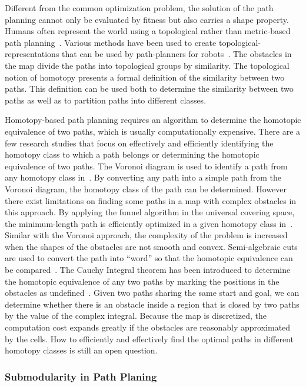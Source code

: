 \documentclass[phd]{byuprop}
\begin{document}
Different from the common optimization problem, the solution of the path planning cannot only be evaluated by fitness but also carries a shape property.
Humans often represent the world using a topological rather than metric-based path planning~\cite{Aginsky1997,kuipers1999}. 
Various methods have been used to create topological-representations that can be used by path-planners for robots~\cite{Mataric1992,Thrun1998,Fasola2013,Shah2013}.
The obstacles in the map divide the paths into topological groups by similarity. 
The topological notion of homotopy presents a formal definition of the similarity between two paths. 
This definition can be used both to determine the similarity between two paths as well as to partition paths into different classes.

Homotopy-based path planning requires an algorithm to determine the homotopic equivalence of two paths, which is usually computationally expensive. 
There are a few research studies that focus on effectively and efficiently identifying the homotopy class to which a path belongs or determining the homotopic equivalence of two paths. 
The Voronoi diagram is used to identify a path from any homotopy class in~\cite{Banerjee2013}. 
By converting any path into a simple path from the Voronoi diagram, the homotopy class of the path can be determined. 
However there exist limitations on finding some paths in a map with complex obstacles in this approach.
By applying the funnel algorithm in the universal covering space, the minimum-length path is efficiently optimized in a given homotopy class in~\cite{Hershberger1994}. 
Similar with the Voronoi approach, the complexity of the problem is increased when the shapes of the obstacles are not smooth and convex. 
Semi-algebraic cuts are used to convert the path into “word” so that the homotopic equivalence can be compared~\cite{Grigoriev1998}. 
The Cauchy Integral theorem has been introduced to determine the homotopic equivalence of any two paths by marking the positions in the obstacles as undefined~\cite{Bhattachary2010}. 
Given two paths sharing the same start and goal, we can determine whether there is an obstacle inside a region that is closed by two paths by the value of the complex integral. 
Because the map is discretized, the computation cost expands greatly if the obstacles are reasonably approximated by the cells.
How to efficiently and effectively find the optimal paths in different homotopy classes is still an open question.

\subsubsection{Submodularity in Path Planing}
\end{document}
